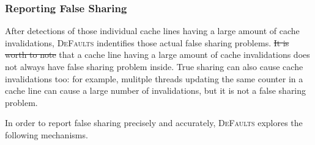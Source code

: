 \documentclass[10pt]{sigplanconf}
\newcommand{\Defaults}{{\scshape DeFaults}}
\newcommand{\defaults}{{\scshape DeFaults}}
\providecommand{\DIFadd}[1]{{\protect\color{blue}\uwave{#1}}} %
\providecommand{\DIFdel}[1]{{\protect\color{red}\sout{#1}}}                      %
\providecommand{\DIFaddbegin}{} %
\providecommand{\DIFaddend}{} %
\providecommand{\DIFdelbegin}{} %
\providecommand{\DIFdelend}{} %
\begin{document}
\subsubsection{Reporting False Sharing}
After detections of those individual cache lines having a large amount of cache invalidations, 
\defaults{} indentifies those actual false sharing problems. 
\DIFdelbegin \DIFdel{It is worth to note }\DIFdelend \DIFaddbegin \DIFadd{Note }\DIFaddend that a cache line having a large amount of cache invalidations does not 
always have false sharing problem inside. 
True sharing can also cause cache invalidations too: for example, mulitple threads updating 
the same counter in a cache line can \DIFaddbegin \DIFadd{also }\DIFaddend cause a large number of invalidations, 
but it is not a false sharing problem.

In order to report false sharing precisely and accurately, 
\Defaults{} explores the following mechanisms. 
\end{document}
